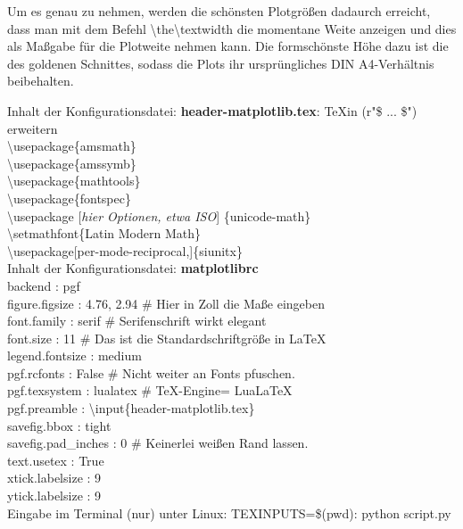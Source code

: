 \documentclass[parskip=half, titlepage=firstiscover, captions=tableheading,bibliography=totoc,]{scrartcl}
\begin{document}
Um es genau zu nehmen, werden die schönsten Plotgrößen dadaurch erreicht, dass man mit dem Befehl \backslash\textsf{the}\backslash\textsf{textwidth} die momentane Weite anzeigen und dies als Maßgabe für die Plotweite nehmen kann.
Die formschönste Höhe dazu ist die des goldenen Schnittes, sodass die Plots ihr ursprüngliches DIN A4-Verhältnis beibehalten.

Inhalt der Konfigurationsdatei:
\textbf{\textsf{header-matplotlib.tex}}: \TeX in (r"\$ ... \$") erweitern\\
\backslash usepackage\{amsmath\} \\
\backslash usepackage\{amssymb\} \\
\backslash usepackage\{mathtools\} \\
\backslash usepackage\{fontspec\} \\
\backslash usepackage [\emph{hier Optionen, etwa ISO}] \{unicode-math\} \\
\backslash setmathfont\{Latin Modern Math\} \\
\backslash usepackage[per-mode-reciprocal,]\{siunitx\} \\

Inhalt der Konfigurationsdatei: 
\textbf{\textsf{matplotlibrc}}\\
backend : pgf \\
figure.figsize : 4.76, 2.94  \# Hier in Zoll die Maße eingeben\\
font.family : serif  \# Serifenschrift wirkt elegant \\
font.size : 11  \# Das ist die Standardschriftgröße in \LaTeX\\ 
legend.fontsize : medium \\
pgf.rcfonts : False \# Nicht weiter an Fonts pfuschen.\\
pgf.texsystem : lualatex \# TeX-Engine= LuaLaTeX\\
pgf.preamble : \backslash input\{header-matplotlib.tex\} \\
savefig.bbox : tight \\
savefig.pad\_inches : 0  \# Keinerlei weißen Rand lassen.\\
text.usetex : True \\
xtick.labelsize : 9 \\
ytick.labelsize : 9 \\

Eingabe im Terminal (nur) unter Linux: 
TEXINPUTS=\$(pwd): python script.py
\end{document}
